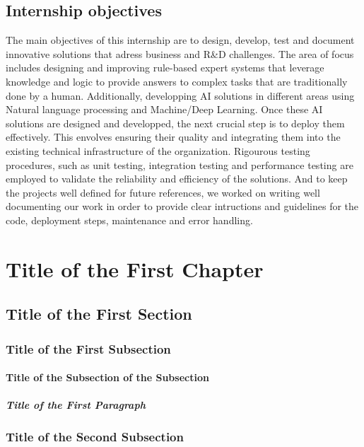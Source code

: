 \documentclass[a4paper,12pt,twoside]{report}
\begin{document}
\section{Internship objectives}
The main objectives of this internship are to design, develop, test and document innovative solutions that adress business and R\&D challenges. The area of focus includes designing and improving rule-based expert systems that leverage knowledge and logic to provide answers to complex tasks that are traditionally done by a human. Additionally, developping AI solutions in different areas using Natural language processing and Machine/Deep Learning. Once these AI solutions are designed and developped, the next crucial step is to deploy them effectively. This envolves ensuring their quality and integrating them into the existing technical infrastructure of the organization. Rigourous testing procedures, such as unit testing, integration testing and performance testing are employed to validate the reliability and efficiency of the solutions. And to keep the projects well defined for future references, we worked on writing well documenting our work in order to provide clear intructions and guidelines for the code, deployment steps, maintenance and error handling.
\chapter{Title of the First Chapter}
\thispagestyle{empty}

\section{Title of the First Section}

\subsection{Title of the First Subsection}

\subsubsection{Title of the Subsection of the Subsection}

\paragraph{Title of the First Paragraph}\par

\subsection{Title of the Second Subsection}
\end{document}
